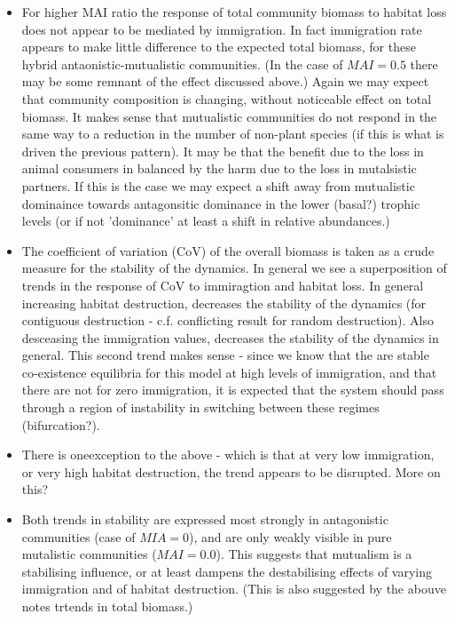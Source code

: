 \begin{itemize}
\begin{itemize}
	\item For higher MAI ratio the response of total community biomass to habitat loss does not appear to be mediated by immigration. In fact immigration rate appears to make little difference to the expected total biomass, for these hybrid antaonistic-mutualistic communities. (In the case of $MAI=0.5$ there may be some remnant of the effect discussed above.) Again we may expect that community composition is changing, without noticeable effect on total biomass. It makes sense that mutualistic communities do not respond in the same way to a reduction in the number of non-plant species (if this is what is driven the previous pattern). It may be that the benefit due to the loss in animal consumers in balanced by the harm due to the loss in mutalsistic partners. If this is the case we may expect a shift away from mutualistic dominaince towards antagonsitic dominance in the lower (basal?) trophic levels (or if not 'dominance' at least a shift in relative abundances.)  
	
	\item The coefficient of variation (CoV) of the overall biomass is taken as a crude measure for the stability of the dynamics. In general we see a superposition of trends in the response of CoV to immiragtion and habitat loss. In general increasing habitat destruction, decreases the stability of the dynamics (for contiguous destruction - c.f. conflicting result for random destruction). Also desceasing the immigration values, decreases the stability of the dynamics in general. This second trend makes sense -  since we know that the are stable co-existence equilibria  for this model at high levels of immigration, and that there are not for zero immigration, it is expected that the system should pass through a region of instability in switching between these regimes (bifurcation?).
	
	\item There is oneexception to the above - which is that at very low immigration, or very high habitat destruction, the trend appears to be disrupted. More on this? 
	
	\item Both trends in stability are expressed most strongly in antagonistic communities (case of $MIA=0$), and are only weakly visible in pure mutalistic communities ($MAI=0.0$). This suggests that mutualism is a stabilising influence, or at least dampens the destabilising effects of varying immigration and of habitat destruction. (This is also suggested by the abouve notes trtends in total biomass.)
	

\end{itemize}
\end{itemize}
